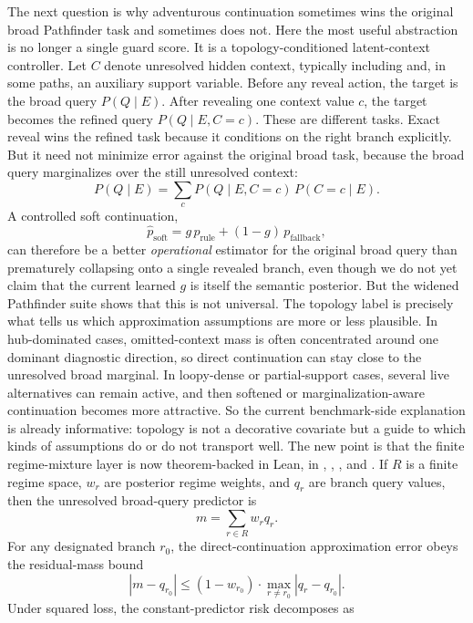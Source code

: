 \documentclass[11pt,openany]{report}
\begin{document}
The next question is why adventurous continuation sometimes wins the
original broad Pathfinder task and sometimes does not.  Here the most
useful abstraction is no longer a single guard score.  It is a
topology-conditioned latent-context controller.  Let $C$ denote
unresolved hidden context, typically including  and, in some
paths, an auxiliary support variable.  Before any reveal action, the
target is the broad query $P(Q \mid E)$.  After revealing one context
value $c$, the target becomes the refined query $P(Q \mid E, C{=}c)$.
These are different tasks.  Exact reveal wins the refined task because
it conditions on the right branch explicitly.  But it need not minimize
error against the original broad task, because the broad query
marginalizes over the still unresolved context:
\[
  P(Q \mid E) = \sum_c P(Q \mid E, C{=}c)\,P(C{=}c \mid E).
\]
A controlled soft continuation,
\[
  \hat p_{\mathrm{soft}} =
  g\,p_{\mathrm{rule}} + (1-g)\,p_{\mathrm{fallback}},
\]
can therefore be a better \emph{operational} estimator for the original
broad query than prematurely collapsing onto a single revealed branch,
even though we do not yet claim that the current learned $g$ is itself
the semantic posterior.  But the widened Pathfinder suite shows that
this is not universal.  The topology label is precisely what tells us
which approximation assumptions are more or less plausible.  In
hub-dominated cases, omitted-context mass is often concentrated around
one dominant diagnostic direction, so direct continuation can stay close
to the unresolved broad marginal.  In loopy-dense or partial-support
cases, several live alternatives can remain active, and then softened or
marginalization-aware continuation becomes more attractive.  So the
current benchmark-side explanation is already informative: topology is
not a decorative covariate but a guide to which kinds of assumptions do
or do not transport well.  The new point is that the finite
regime-mixture layer is now theorem-backed in Lean, in
,
,
, and
.  If $R$ is a finite regime space,
$w_r$ are posterior regime weights, and $q_r$ are branch query values,
then the unresolved broad-query predictor is
\[
  m = \sum_{r \in R} w_r q_r.
\]
For any designated branch $r_0$, the direct-continuation approximation
error obeys the residual-mass bound
\[
  |m - q_{r_0}| \le (1 - w_{r_0}) \cdot
  \max_{r \neq r_0} |q_r - q_{r_0}|.
\]
Under squared loss, the constant-predictor risk decomposes as
\end{document}
